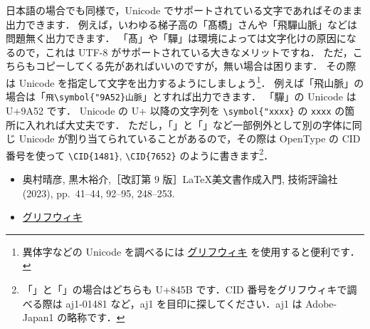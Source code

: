 日本語の場合でも同様で，Unicode でサポートされている文字であればそのまま出力できます．
例えば，いわゆる梯子高の「髙橋」さんや「飛驒山脈」などは問題無く出力できます．
「髙」や「驒」は環境によっては文字化けの原因になるので，これは UTF-8 がサポートされている大きなメリットですね．
ただ，こちらもコピーしてくる先があればいいのですが，無い場合は困ります．
その際は Unicode を指定して文字を出力するようにしましょう\footnote{異体字などの Unicode を調べるには \href{https://glyphwiki.org/wiki/}{グリフウィキ} を使用すると便利です．}．
例えば「飛山脈」の場合は「\verb|飛\symbol{"9A52}山脈|」とすれば出力できます．
「驒」の Unicode は U+9A52 です．
Unicode の U+ 以降の文字列を \verb|\symbol{"xxxx}| の \verb|xxxx| の箇所に入れれば大丈夫です．
ただし，「」と「」など一部例外として別の字体に同じ Unicode が割り当てられていることがあるので，その際は OpenType の CID 番号を使って \verb|\CID{1481}|, \verb|\CID{7652}| のように書きます\footnote{「」と「」の場合はどちらも U+845B です．CID 番号をグリフウィキで調べる際は aj1-01481 など，aj1 を目印に探してください．aj1 は Adobe-Japan1 の略称です．}．

\begin{tcolorbox}[title={第~\ref{ch:notation}~章の参考文献}, colback=yellow!5!white, colframe=yellow!75!black, coltitle=black]
    \begin{itemize}
        \item 奥村晴彦, 黒木裕介,［改訂第 9 版］\LaTeX 美文書作成入門, 技術評論社 (2023), pp.~41--44, 92--95, 248--253.
        \item \href{https://glyphwiki.org/wiki/}{グリフウィキ}
    \end{itemize}
\end{tcolorbox}


